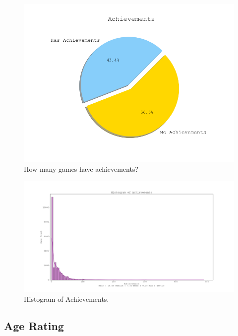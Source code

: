 \documentclass[conference]{IEEEtran}
\begin{document}
\begin{figure}[htp]
  \includegraphics[width=\linewidth]{assets/achievements_pie.png}
  \caption{How many games have achievements?}
  \label{fig:achievements1}
\end{figure}

\begin{figure}[htp]
  \includegraphics[width=\linewidth]{assets/achievements_hist.png}
  \caption{Histogram of Achievements.}
  \label{fig:achievements2}
\end{figure}


\subsection{Age Rating}
\end{document}

